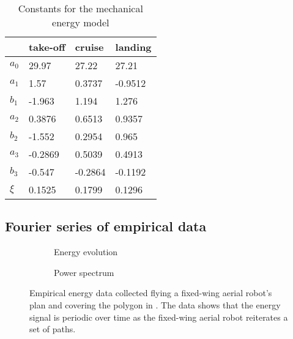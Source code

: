 \begin{table}[h]
  \centering
  \caption{Constants for the mechanical energy model}
  \begin{tabular}{l|lll}
    \hline
     & take-off & cruise & landing \\\hline
    $a_0$ & 29.97   & 27.22   & 27.21\\
    $a_1$ & 1.57    & 0.3737  & -0.9512\\
    $b_1$ & -1.963  & 1.194   & 1.276\\
    $a_2$ & 0.3876  & 0.6513  & 0.9357\\
    $b_2$ & -1.552  & 0.2954  & 0.965\\
    $a_3$ & -0.2869 & 0.5039  & 0.4913\\
    $b_3$ & -0.547  & -0.2864 & -0.1192\\
    $\xi$ & 0.1525  & 0.1799  & 0.1296\\
    \hline
  \end{tabular}
  \label{tab:constants}
\end{table}

\subsection{\color{cyan}Fourier series of empirical data}
\label{sec:fourier}

\begin{figure}[t]
  \footnotesize
  \centering
  \begin{subfigure}[b]{0.48\textwidth}
    \centering
    \footnotesize{}
    
    \caption{Energy evolution}
    \label{fig:energy-1}
  \end{subfigure}\hspace{2mm}
  \begin{subfigure}[b]{0.48\textwidth}
    \centering
    \footnotesize{}
    
    \caption{Power spectrum}
    \label{fig:spectrum-1}
  \end{subfigure}
  \caption[Energy data of a fixed-wing aerial robot]{Empirical energy data collected flying a fixed-wing aerial robot's plan and covering the polygon in . The data shows that the energy signal is periodic over time as the fixed-wing aerial robot reiterates a set of paths.}
\end{figure}

